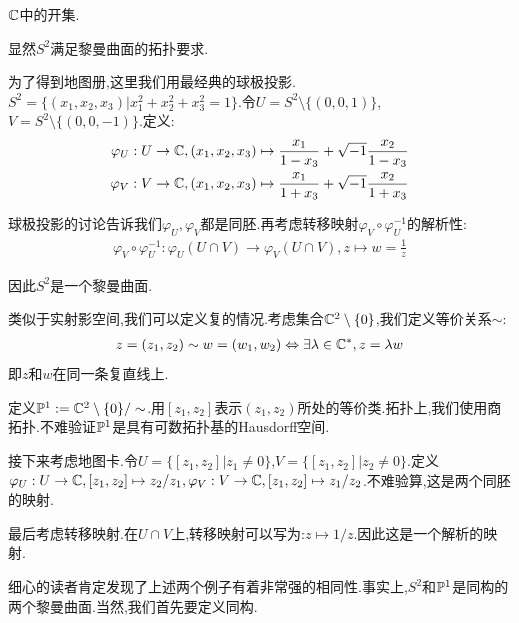 \begin{example}[平凡的例子]
	$\mathbb{C}$中的开集.
\end{example}
\begin{example}[二维球面$S^2$.]
    显然$S^2$满足黎曼曲面的拓扑要求.

	为了得到地图册,这里我们用最经典的球极投影.$S^2=\{(x_1,x_2,x_3)|x_1^2+x_2^2+x_3^2=1\}$.令$U=S^2\setminus \{(0,0,1)\}$,$V=S^2\setminus \{(0,0,-1)\}$.定义:
	\begin{align*}
		\varphi_U:U \to \mathbb{C}, (x_1,x_2,x_3)\mapsto \frac{x_1}{1-x_3}+\sqrt{-1}\frac{x_2}{1-x_3}\\
		\varphi_V:V \to \mathbb{C},(x_1,x_2,x_3)\mapsto \frac{x_1}{1+x_3}+\sqrt{-1}\frac{x_2}{1+x_3}
	\end{align*}

	球极投影的讨论告诉我们$\varphi_U,\varphi_V$都是同胚.再考虑转移映射$\varphi_V \circ \varphi_U^{-1}$的解析性:
   \begin{align*}
	\varphi_V \circ \varphi_U^{-1}:\varphi_U(U\cap V)\to \varphi_V(U\cap V),z \mapsto w=\frac{1}{z}
   \end{align*}

   因此$S^2$是一个黎曼曲面.
\end{example}
\begin{example}[射影直线$\PP^1$]
	类似于实射影空间,我们可以定义复的情况.考虑集合$\mathbb{C}^2\setminus\{0\}$,我们定义等价关系$\sim$:
	\begin{align*}
		z=(z_1,z_2)\sim w=(w_1,w_2) \Leftrightarrow \exists \lambda \in \mathbb{C}^*,z=\lambda w
	\end{align*}
	即$z$和$w$在同一条复直线上.

	定义$\mathbb{P}^1:=\mathbb{C}^2\setminus\{0\}/\sim$.用$[z_1,z_2]$表示$(z_1,z_2)$所处的等价类.拓扑上,我们使用商拓扑.不难验证$\PP^1$是具有可数拓扑基的Hausdorff空间.

   接下来考虑地图卡.令$U=\{[z_1,z_2]|z_1\neq 0\}$,$V=\{[z_1,z_2]|z_2\neq 0\}$.定义$\varphi_U:U \to \mathbb{C},[z_1,z_2]\mapsto z_2/z_1,\varphi_V:V \to \mathbb{C},[z_1,z_2]\mapsto z_1/z_2$.不难验算,这是两个同胚的映射.

   最后考虑转移映射.在$U\cap V$上,转移映射可以写为:$z\mapsto 1/z$.因此这是一个解析的映射.
\end{example}

细心的读者肯定发现了上述两个例子有着非常强的相同性.事实上,$S^2$和$\PP^1$是同构的两个黎曼曲面.当然,我们首先要定义同构.

